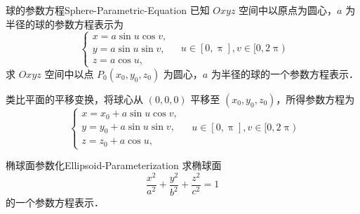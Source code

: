 \begin{problem}{球的参数方程}{Sphere-Parametric-Equation}
    已知 $Oxyz$ 空间中以原点为圆心，$a$ 为半径的球的参数方程表示为
    \begin{equation}
        \begin{cases}
            x = a \sin u \cos v, \\
            y = a \sin u \sin v, \\
            z = a \cos u,
        \end{cases} \quad u \in [0, \uppi], v \in [0, 2\uppi)
    \end{equation}
    求 $Oxyz$ 空间中以点 $P_0(x_0, y_0, z_0)$ 为圆心，$a$ 为半径的球的一个参数方程表示．
\end{problem}

\begin{solution}
    类比平面的平移变换，将球心从 $(0, 0, 0)$ 平移至 $(x_0, y_0, z_0)$，所得参数方程为
    \begin{equation}
        \boxed{
        \begin{cases}
            x = x_0 + a \sin u \cos v, \\
            y = y_0 + a \sin u \sin v, \\
            z = z_0 + a \cos u,
        \end{cases} \quad u \in [0, \uppi], v \in [0, 2\uppi)
        }
    \end{equation}
\end{solution}


\begin{problem}{椭球面参数化}{Ellipsoid-Parameterization}
    求椭球面
    \begin{equation}
        \frac{x^2}{a^2} + \frac{y^2}{b^2} + \frac{z^2}{c^2} = 1
    \end{equation}
    的一个参数方程表示．
\end{problem}

